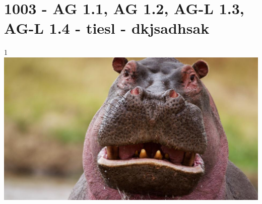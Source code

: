 \section{1003 - AG 1.1, AG 1.2, AG-L 1.3, AG-L 1.4 - tiesl - dkjsadhsak}

\begin{langesbeispiel} \item[1] %
\includegraphics{../_database_inoffiziell/Bilder/1003_hippo.eps}


\end{langesbeispiel}